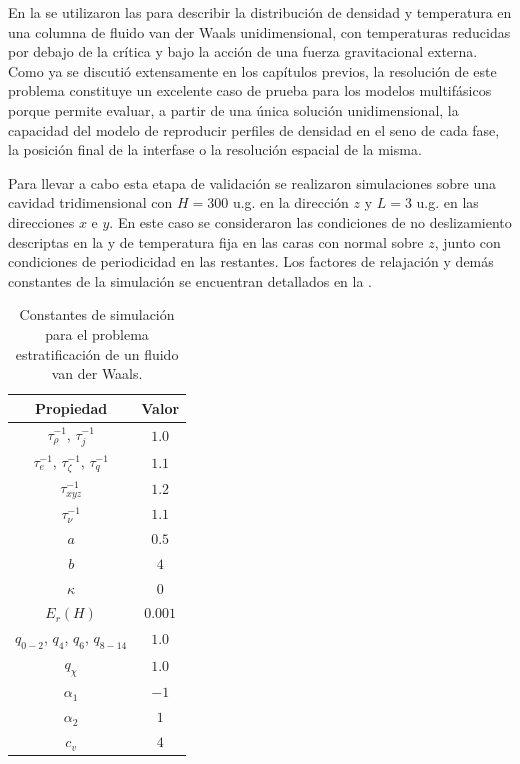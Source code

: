 En la  se utilizaron las  para describir la distribuci\'on de densidad y temperatura en una columna de fluido van der Waals unidimensional, con temperaturas reducidas por debajo de la cr\'itica y bajo la acci\'on de una fuerza gravitacional externa. Como ya se discuti\'o extensamente en los cap\'itulos previos, la resoluci\'on de este problema constituye un excelente caso de prueba para los modelos multif\'asicos \pp{} porque permite evaluar, a partir de una \'unica soluci\'on unidimensional, la capacidad del modelo de reproducir perfiles de densidad en el seno de cada fase, la posici\'on final de la interfase o la resoluci\'on espacial de la misma.


Para llevar a cabo esta etapa de validaci\'on se realizaron simulaciones sobre una cavidad tridimensional con $H=300$ u.g. en la direcci\'on $z$ y $L=3$ u.g. en las direcciones $x$ e $y$. En este caso se consideraron las condiciones de no deslizamiento descriptas en la  y de temperatura fija en las caras con normal sobre $z$, junto con condiciones de periodicidad en las restantes. Los factores de relajaci\'on y dem\'as constantes de la simulaci\'on se encuentran detallados en la .

\begin{table}[ht]
	\centering
    \begin{tabular}{c c}
	    \toprule
        \bf Propiedad & \bf Valor \\
        \midrule
        $\tau_{\rho}^{-1}$, $\tau_{j}^{-1}$ & $1.0$ \\
        $\tau_{e}^{-1}$, $\tau_{\zeta}^{-1}$, $\tau_{q}^{-1}$ & $1.1$ \\
        $\tau_{xyz}^{-1}$ & $1.2$ \\
        $\tau_{\nu}^{-1}$ & $1.1$ \\
		$a$ & $0.5$ \\
		$b$ & $4$ \\
		$\kappa$   & 0 \\
		$E_r (H)$  & $0.001$ \\
		$q_{0-2}$, $q_4$, $q_{6}$, $q_{8-14}$ & $1.0$ \\
		$q_{\chi}$ & $1.0$ \\
		$\alpha_1$ & $-1$ \\
		$\alpha_2$ & $1$ \\
		$c_v$      & $4$ \\
        \bottomrule
	\end{tabular}
	\caption{Constantes de simulaci\'on para el problema estratificaci\'on de un fluido van der Waals.}
	\label{tab:vdwColumn3D_prop}
\end{table}  

